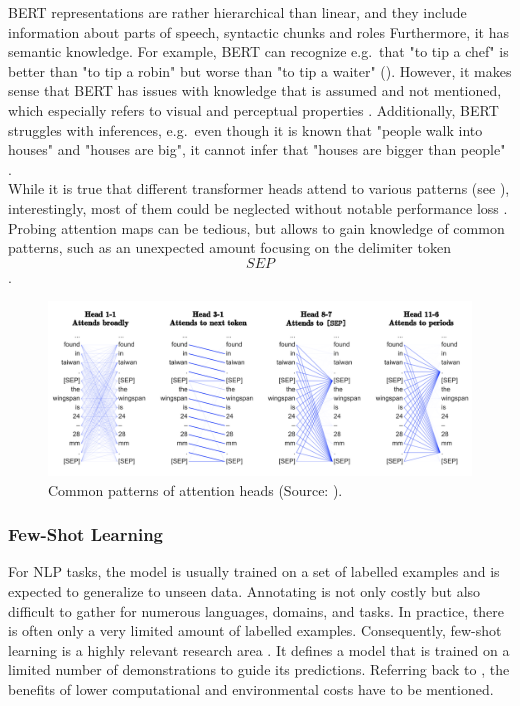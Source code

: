 \documentclass[
]{krantz}
\begin{document}
BERT representations are rather hierarchical than linear, and they
include information about parts of speech, syntactic chunks and roles
\citep[\citet{Liu2019}]{Lin2019} Furthermore, it has semantic knowledge.
For example, BERT can recognize e.g.~that "to tip a chef" is better
than "to tip a robin" but worse than "to tip a waiter"
(\citep{Ettinger2019}). However, it makes sense that BERT has issues with
knowledge that is assumed and not mentioned, which especially refers to
visual and perceptual properties \citep{Da2019}. Additionally, BERT
struggles with inferences, e.g.~even though it is known that "people
walk into houses" and "houses are big", it cannot infer that "houses
are bigger than people" \citep{Forbes2019}.\\

While it is true that different transformer heads attend to various
patterns (see ), interestingly, most of them could be neglected without
notable performance loss \citep{Voita2019}. Probing attention maps can be
tedious, but allows to gain knowledge of common patterns, such as an
unexpected amount focusing on the delimiter token \[SEP\].

\begin{figure}

{\centering \includegraphics[width=0.9\linewidth]{./figures/01-01-nlp/ct_attention-heads} 

}

\caption{Common patterns of attention heads (Source: \citet{Clark2019}).}\label{fig:ctattentionheads}
\end{figure}



\hypertarget{few-shot-learning}{%
\subsubsection{Few-Shot Learning}\label{few-shot-learning}}

For NLP tasks, the model is usually trained on a set of labelled
examples and is expected to generalize to unseen data. Annotating is not
only costly but also difficult to gather for numerous languages,
domains, and tasks. In practice, there is often only a very limited
amount of labelled examples. Consequently, few-shot learning is a highly
relevant research area \citep{Schick2020}. It defines a model that is
trained on a limited number of demonstrations to guide its predictions.
Referring back to , the benefits of lower computational and
environmental costs have to be mentioned.\\
\end{document}
